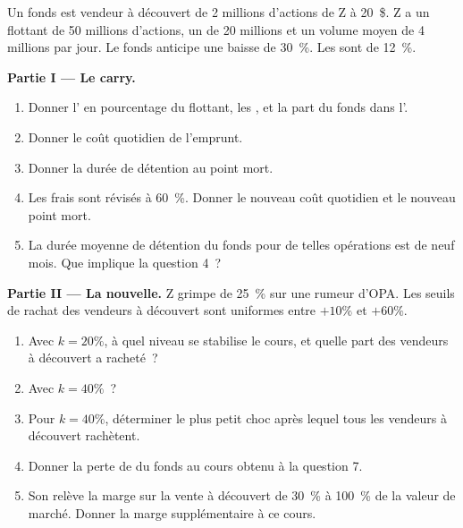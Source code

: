 \begin{problem}\label{pb:m1:stock-loan-and-short-selling:1}
Un fonds est vendeur à découvert de 2 millions d'actions de Z à 20~\$. Z a un flottant de 50 millions
d'actions, un  de 20 millions et un volume moyen de 4 millions par
jour. Le fonds anticipe une baisse de 30~\%. Les  sont de 12~\%.

\medskip\noindent\textbf{Partie I --- Le carry.}
\begin{enumerate}
\item Donner l' en pourcentage du flottant, les ,
et la part du fonds dans l'.
\item Donner le coût quotidien de l'emprunt.
\item Donner la durée de détention au point mort.
\item Les frais sont révisés à 60~\%. Donner le nouveau coût quotidien et le nouveau point mort.
\item La durée moyenne de détention du fonds pour de telles opérations est de neuf mois. Que
implique la question 4~?
\end{enumerate}

\medskip\noindent\textbf{Partie II --- La nouvelle.}
Z grimpe de 25~\% sur une rumeur d'OPA. Les seuils de rachat des vendeurs à découvert sont
uniformes entre $+10\%$ et $+60\%$.
\begin{enumerate}[resume]
\item Avec $k = 20\%$, à quel niveau se stabilise le cours, et quelle part des
vendeurs à découvert a racheté~?
\item Avec $k = 40\%$~?
\item Pour $k = 40\%$, déterminer le plus petit choc après lequel tous les vendeurs à découvert rachètent.
\item Donner la perte de  du fonds au cours obtenu à la question 7.
\item Son  relève la marge sur la vente à découvert de 30~\% à 100~\% de la
valeur de marché. Donner la marge supplémentaire à ce cours.
\end{enumerate}


\end{problem}
